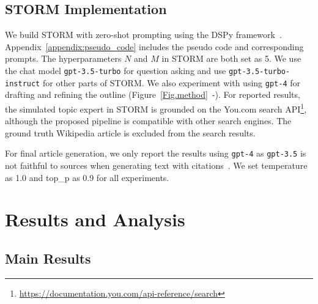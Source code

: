 \documentclass[11pt]{article}
\newcommand{\system}[0]{STORM\xspace}
\newcommand{\reffig}[1]{Figure~\ref{#1}}
\begin{document}
\subsection{\system Implementation}
We build \system with zero-shot prompting using the DSPy framework~\citep{khattab2023dspy}. Appendix~\ref{appendix:pseudo_code} includes the pseudo code and corresponding prompts. The hyperparameters $N$ and $M$ in \system are both set as 5. We use the chat model \texttt{gpt-3.5-turbo} for question asking and use \texttt{gpt-3.5-turbo-instruct} for other parts of \system. We also experiment with using \texttt{gpt-4} for drafting and refining the outline (\reffig{Fig.method}~-). For reported results, the simulated topic expert in \system is grounded on the You.com search API\footnote{\url{https://documentation.you.com/api-reference/search}}, although the proposed pipeline is compatible with other search engines. The ground truth Wikipedia article is excluded from the search results.

For final article generation, we only report the results using \texttt{gpt-4} as \texttt{gpt-3.5} is not faithful to sources when generating text with citations~\citep{gao-etal-2023-enabling}. We set temperature as 1.0 and top\_p as 0.9 for all experiments.






\section{Results and Analysis}

\label{sec:results}


\subsection{Main Results}
\label{sec:main_result}
\end{document}
